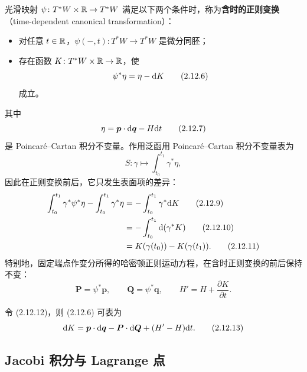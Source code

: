 光滑映射 $\psi\colon T^*W\times\mathbb{R}\to T^*W$ 满足以下两个条件时，称为\textbf{含时的正则变换}（time-dependent canonical transformation）：
\begin{itemize}[leftmargin=2em]
  \item 对任意 $t\in\mathbb{R}$，$\psi(-,t)\colon T^*W\to T^*W$ 是微分同胚；
  \item 存在函数 $K\colon T^*W\times\mathbb{R}\to\mathbb{R}$，使
\begin{equation}
  \psi^*\eta = \eta - \mathrm{d} K
  \tag{2.12.6}
\end{equation}
成立。
\end{itemize}
其中
\begin{equation}
  \eta = \bm{p}\cdot\mathrm{d}\bm{q} - H\mathrm{d} t
  \tag{2.12.7}
\end{equation}
是 Poincaré--Cartan 积分不变量。作用泛函用 Poincaré--Cartan 积分不变量表为
\begin{equation}
  S\colon\gamma\mapsto\int_{t_0}^{t_1}\gamma^*\eta,
  \tag{2.12.8}
\end{equation}
因此在正则变换前后，它只发生表面项的差异：
\begin{align}
  \int_{t_0}^{t_1}\gamma^*\psi^*\eta - \int_{t_0}^{t_1}\gamma^*\eta
  &= -\int_{t_0}^{t_1}\gamma^*\mathrm{d} K
  \tag{2.12.9}\\
  &= -\int_{t_0}^{t_1}\mathrm{d}(\gamma^*K)
  \tag{2.12.10}\\
  &= K(\gamma(t_0)) - K(\gamma(t_1)).
  \tag{2.12.11}
\end{align}
特别地，固定端点作变分所得的哈密顿正则运动方程，在含时正则变换的前后保持不变：
\begin{equation}
  \bm{P} = \psi^*\bm{p},\qquad
  \bm{Q} = \psi^*\bm{q},\qquad
  H' = H + \frac{\partial K}{\partial t}.
  \tag{2.12.12}
\end{equation}

令 (2.12.12)，则 (2.12.6) 可表为
\begin{equation}
  \mathrm{d} K = \bm{p}\cdot\mathrm{d}\bm{q} - \bm{P}\cdot\mathrm{d}\bm{Q} + (H'-H)\mathrm{d} t.
  \tag{2.12.13}
\end{equation}

\subsection{Jacobi 积分与 Lagrange 点}

